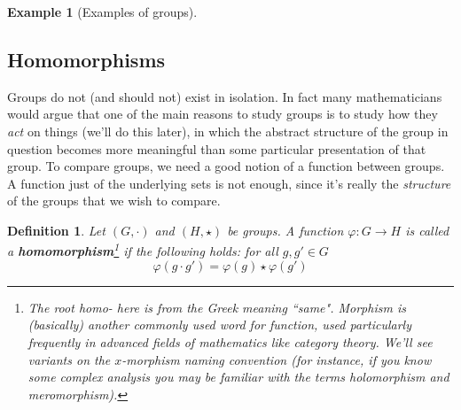 \documentclass[12pt]{article}
\numberwithin{equation}{subsection}
\newtheorem{defn}[subsection]{Definition}
\theoremstyle{note}
\newtheorem{example}[subsection]{Example}
\begin{document}
\begin{example}[Examples of groups]
\begin{enumerate}
\end{enumerate}
\end{example}






\subsection{Homomorphisms}
Groups do not (and should not) exist in isolation. In fact many mathematicians would argue that one of the main reasons to study groups is to study how they \textit{act} on things (we'll do this later), in which the abstract structure of the group in question becomes more meaningful than some particular presentation of that group. To compare groups, we need a good notion of a function between groups. A function just of the underlying sets is not enough, since it's really the \textit{structure} of the groups that we wish to compare. 

\begin{defn} Let $(G,\cdot)$ and $(H,\star)$ be groups. A function $\varphi\colon G\to H$ is called a \textbf{homomorphism}\footnote{The root \textit{homo}- here is from the Greek meaning ``same". \textit{Morphism} is (basically) another commonly used word for function, used particularly frequently in advanced fields of mathematics like category theory. We'll see variants on the $x$-morphism naming convention (for instance, if you know some complex analysis you may be familiar with the terms \textit{holomorphism} and \textit{meromorphism}). } if the following holds: for all $g,g'\in G$ \begin{equation} \varphi( g \cdot g')=\varphi(g) \star \varphi(g')\end{equation}
\end{defn}
\end{document}
